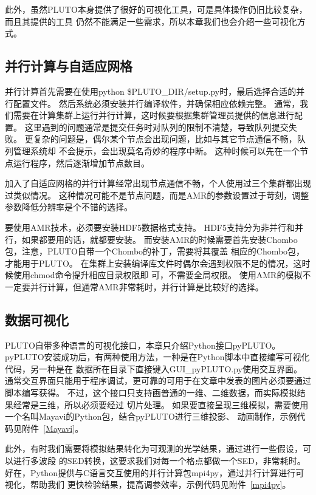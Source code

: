此外，虽然PLUTO本身提供了很好的可视化工具，可是具体操作仍旧比较复杂，而且其提供的工具
仍然不能满足一些需求，所以本章我们也会介绍一些可视化方式。

\subsection{并行计算与自适应网格}
并行计算首先需要在使用python \$PLUTO\_DIR/setup.py时，最后选择合适的并行配置文件。
然后系统必须安装并行编译软件，并确保相应依赖完整。
通常，我们需要在计算集群上运行并行计算，这时候要根据集群管理员提供的信息进行配置。
这里遇到的问题通常是提交任务时对队列的限制不清楚，导致队列提交失败。
更复杂的问题是，偶尔某个节点会出现问题，比如与其它节点通信不畅，队列管理系统却
不会提示，会出现莫名奇妙的程序中断。
这种时候可以先在一个节点运行程序，然后逐渐增加节点数目。

加入了自适应网格的并行计算经常出现节点通信不畅，个人使用过三个集群都出现过类似情况。
这种情况可能不是节点问题，而是AMR的参数设置过于苛刻，调整参数降低分辨率是个不错的选择。

要使用AMR技术，必须要安装HDF5数据格式支持。
HDF5支持分为非并行和并行，如果都要用的话，就都要安装。
而安装AMR的时候需要首先安装Chombo包，注意，PLUTO自带一个Chombo的补丁，需要将其覆盖
相应的Chombo包，才能用于PLUTO。
在集群上安装编译库文件时偶尔会遇到权限不足的情况，这时候使用chmod命令提升相应目录权限即
可，不需要全局权限。
使用AMR的模拟不一定要并行计算，但通常AMR非常耗时，并行计算是比较好的选择。

\subsection{数据可视化}
PLUTO自带多种语言的可视化接口，本章只介绍Python接口pyPLUTO。
pyPLUTO安装成功后，有两种使用方法，一种是在Python脚本中直接编写可视化代码，另一种是在
数据所在目录下直接键入GUI\_pyPLUTO.py使用交互界面。
通常交互界面只能用于程序调试，更可靠的可用于在文章中发表的图片必须要通过脚本编写获得。
不过，这个接口只支持画普通的一维、二维数据，而实际模拟结果经常是三维，所以必须要经过
切片处理。
如果要直接呈现三维模拟，需要使用一个名叫Mayavi的Python包，结合pyPLUTO进行三维投影、
动画制作，示例代码见附件~\ref{Mayavi}。

此外，有时我们需要将模拟结果转化为可观测的光学结果，通过进行一些假设，可以进行多波段
的SED转换，这要求我们对每一个格点都做一个SED，非常耗时。
好在，Python提供与C语言交互使用的并行计算包mpi4py，通过并行计算进行可视化，帮助我们
更快检验结果，提高调参效率，示例代码见附件~\ref{mpi4py}。
